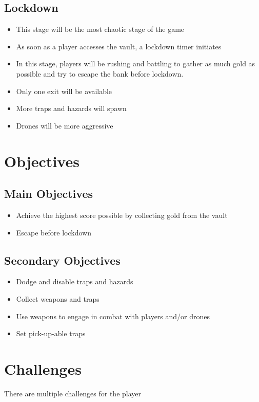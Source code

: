 \documentclass[14pts]{report}
\begin{document}
\subsection{Lockdown}
\begin{itemize}
    \item This stage will be the most chaotic stage of the game
    \item As soon as a player accesses the vault, a lockdown timer initiates
    \item In this stage, players will be rushing and battling to gather as much gold as possible and try to escape the bank before lockdown.
    \item Only one exit will be available
    \item More traps and hazards will spawn
    \item Drones will be more aggressive
\end{itemize}

\section{Objectives}
\subsection{Main Objectives}
\begin{itemize}
    \item Achieve the highest score possible by collecting gold from the vault
    \item Escape before lockdown
\end{itemize}
\subsection{Secondary Objectives}
\begin{itemize}
    \item Dodge and disable traps and hazards
    \item Collect weapons and traps
    \item Use weapons to engage in combat with players and/or drones
    \item Set pick-up-able traps
\end{itemize}

\section{Challenges}
There are multiple challenges for the player
\end{document}
